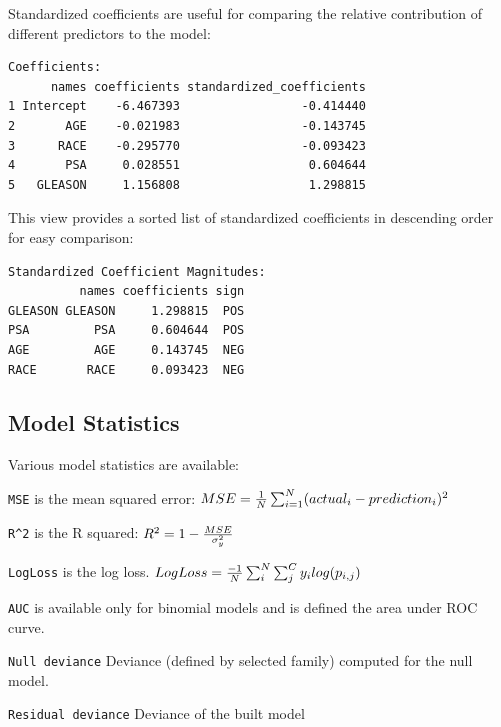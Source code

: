 Standardized coefficients are useful for comparing the relative contribution of different predictors to the
model:



\begin{lstlisting}[style=output]
Coefficients:
      names coefficients standardized_coefficients
1 Intercept    -6.467393                 -0.414440
2       AGE    -0.021983                 -0.143745
3      RACE    -0.295770                 -0.093423
4       PSA     0.028551                  0.604644
5   GLEASON     1.156808                  1.298815
\end{lstlisting}

This view provides a sorted list of standardized coefficients in descending order for easy comparison:



\begin{lstlisting}[style=output]
Standardized Coefficient Magnitudes:
          names coefficients sign
GLEASON GLEASON     1.298815  POS
PSA         PSA     0.604644  POS
AGE         AGE     0.143745  NEG
RACE       RACE     0.093423  NEG
\end{lstlisting}

\subsection{Model Statistics}

Various model statistics are available:

\texttt{MSE} is the mean squared error: $MSE = {1 \over N} \sum_{i=1}^N (actual_i - prediction_i)^2$

\texttt{R\textasciicircum2} is the R squared: $R^2 = 1 - {MSE \over \sigma_y^2}$

\texttt{LogLoss} is the log loss. $LogLoss = {-1 \over N} \sum_i^N \sum_j^C y_{i}log(p_{i,j})$

\texttt{AUC} is available only for binomial models and is defined the area under ROC curve.


\texttt{Null deviance} Deviance (defined by selected family) computed for the null model. 

\texttt{Residual deviance} Deviance of the built model


